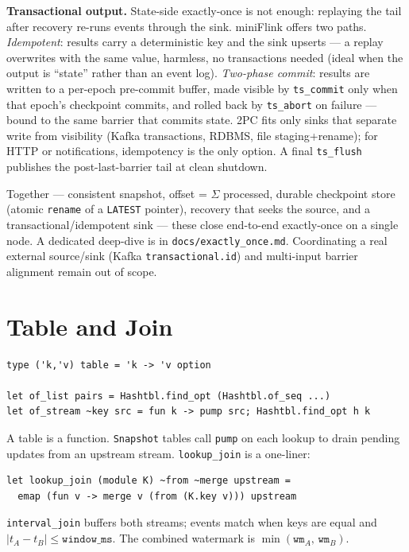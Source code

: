 \documentclass[11pt,a4paper]{article}
\begin{document}
\textbf{Transactional output.} State-side exactly-once is not enough:
replaying the tail after recovery re-runs events through the sink.
miniFlink offers two paths. \emph{Idempotent}: results carry a
deterministic key and the sink upserts — a replay overwrites with the
same value, harmless, no transactions needed (ideal when the output is
``state'' rather than an event log). \emph{Two-phase commit}: results are
written to a per-epoch pre-commit buffer, made visible by
\texttt{ts\_commit} only when that epoch's checkpoint commits, and
rolled back by \texttt{ts\_abort} on failure — bound to the same barrier
that commits state. 2PC fits only sinks that separate write from
visibility (Kafka transactions, RDBMS, file staging+rename); for HTTP or
notifications, idempotency is the only option. A final \texttt{ts\_flush}
publishes the post-last-barrier tail at clean shutdown.

Together — consistent snapshot, offset = $\Sigma$ processed, durable
checkpoint store (atomic \texttt{rename} of a \texttt{LATEST} pointer),
recovery that seeks the source, and a transactional/idempotent sink —
these close end-to-end exactly-once on a single node. A dedicated
deep-dive is in \texttt{docs/exactly\_once.md}. Coordinating a real
external source/sink (Kafka \texttt{transactional.id}) and multi-input
barrier alignment remain out of scope.

\section{Table and Join}

\begin{lstlisting}
type ('k,'v) table = 'k -> 'v option

let of_list pairs = Hashtbl.find_opt (Hashtbl.of_seq ...)
let of_stream ~key src = fun k -> pump src; Hashtbl.find_opt h k
\end{lstlisting}

A table is a function. \texttt{Snapshot} tables call \texttt{pump}
on each lookup to drain pending updates from an upstream stream.
\texttt{lookup\_join} is a one-liner:

\begin{lstlisting}
let lookup_join (module K) ~from ~merge upstream =
  emap (fun v -> merge v (from (K.key v))) upstream
\end{lstlisting}

\texttt{interval\_join} buffers both streams; events match when
keys are equal and $|t_A - t_B| \leq \mathtt{window\_ms}$. The
combined watermark is $\min(\mathtt{wm}_A,\, \mathtt{wm}_B)$.
\end{document}
